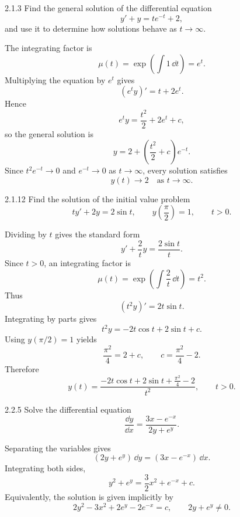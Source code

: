 \documentclass[11pt,oneside]{article}
\begin{document}

\begin{problem}{2.1.3}
Find the general solution of the differential equation
\[
    y'+y=te^{-t}+2,
\]
and use it to determine how solutions behave as $t\to\infty$.
\end{problem}

\begin{solution}
The integrating factor is
\[
    \mu(t)=\exp\!\left(\int 1\,\dd t\right)=e^t.
\]
Multiplying the equation by $e^t$ gives
\[
    (e^t y)'=t+2e^t.
\]
Hence
\[
    e^t y=\frac{t^2}{2}+2e^t+c,
\]
so the general solution is
\[
    \boxed{y=2+\left(\frac{t^2}{2}+c\right)e^{-t}}.
\]
Since $t^2e^{-t}\to0$ and $e^{-t}\to0$ as $t\to\infty$, every solution satisfies
\[
    \boxed{y(t)\to2\quad\text{as }t\to\infty}.
\]
\end{solution}

\begin{problem}{2.1.12}
Find the solution of the initial value problem
\[
    ty'+2y=2\sin t,
    \qquad
    y\left(\frac{\pi}{2}\right)=1,
    \qquad
    t>0.
\]
\end{problem}

\begin{solution}
Dividing by $t$ gives the standard form
\[
    y'+\frac{2}{t}y=\frac{2\sin t}{t}.
\]
Since $t>0$, an integrating factor is
\[
    \mu(t)=\exp\!\left(\int\frac{2}{t}\,\dd t\right)=t^2.
\]
Thus
\[
    (t^2y)'=2t\sin t.
\]
Integrating by parts gives
\[
    t^2y=-2t\cos t+2\sin t+c.
\]
Using $y(\pi/2)=1$ yields
\[
    \frac{\pi^2}{4}=2+c,
    \qquad
    c=\frac{\pi^2}{4}-2.
\]
Therefore
\[
    \boxed{
        y(t)=\frac{-2t\cos t+2\sin t+\frac{\pi^2}{4}-2}{t^2},
        \qquad t>0
    }.
\]
\end{solution}

\begin{problem}{2.2.5}
Solve the differential equation
\[
    \frac{\dd y}{\dd x}=\frac{3x-e^{-x}}{2y+e^y}.
\]
\end{problem}

\begin{solution}
Separating the variables gives
\[
    (2y+e^y)\,\dd y=(3x-e^{-x})\,\dd x.
\]
Integrating both sides,
\[
    y^2+e^y=\frac{3}{2}x^2+e^{-x}+c.
\]
Equivalently, the solution is given implicitly by
\[
    \boxed{2y^2-3x^2+2e^y-2e^{-x}=c},
    \qquad
    2y+e^y\neq0.
\]
\end{solution}
\end{document}
